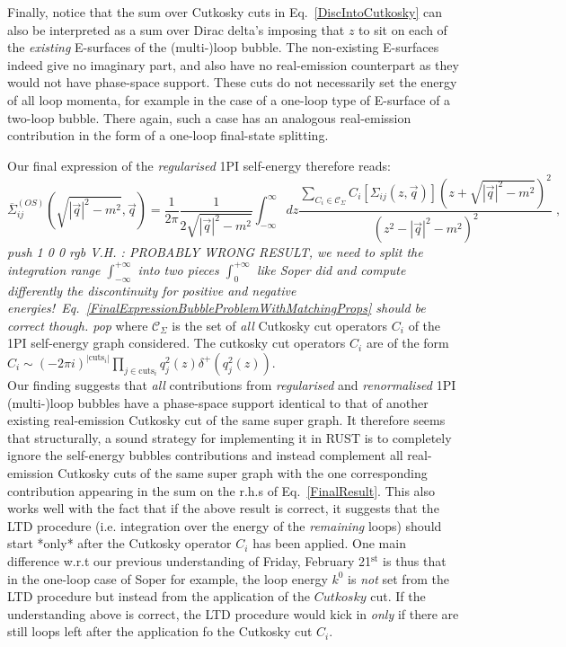 \documentclass[11pt]{article}
\def\cmtVH#1{\emph{\pdfcolorstack\MyArticleWithColor push {1 0 0 rgb} V.H. : #1 \pdfcolorstack\MyArticleWithColor pop}}
\begin{document}
Finally, notice that the sum over Cutkosky cuts in Eq.~\ref{DiscIntoCutkosky} can also be interpreted as a sum over Dirac delta's imposing that $z$ to sit on each of the \emph{existing} E-surfaces of the (multi-)loop bubble.
The non-existing E-surfaces indeed give no imaginary part, and also have no real-emission counterpart as they would not have phase-space support.
These cuts do not necessarily set the energy of all loop momenta, for example in the case of a one-loop type of E-surface of a two-loop bubble. There again, such a case has an analogous real-emission contribution in the form of a one-loop final-state splitting.

Our final expression of the \emph{regularised} 1PI self-energy therefore reads:
\begin{equation}
\overline{\Sigma}_{ij}^{(OS)}(\sqrt{|\vec{q}|^2-m^2 }, \vec{q}) = \frac{ 1 }{2\pi} \frac{1}{2\sqrt{|\vec{q}|^2-m^2 }} 
\int_{-\infty}^\infty dz \frac{ 
\sum_{C_i \in \mathcal{C}_\Sigma} C_i\left[ \Sigma_{ij}(z, \vec{q})\right] \left( z + \sqrt{|\vec{q}|^2-m^2 }\right)^2
}{( z^2 - |\vec{q}|^2-m^2)^2 } \;
\label{FinalResult},
\end{equation}
\cmtVH{PROBABLY WRONG RESULT, we need to split the integration range $\int_{-\infty}^{+\infty}$ into two pieces $\int_{0}^{+\infty}$ like Soper did and compute differently the discontinuity for positive and negative energies!\ Eq.~\ref{FinalExpressionBubbleProblemWithMatchingProps} should be correct though.}
where $\mathcal{C}_\Sigma$ is the set of \emph{all} Cutkosky cut operators $C_i$ of the 1PI self-energy graph considered.
The cutkosky cut operators $C_i$ are of the form $C_i \sim (-2\pi i)^{|\textrm{cuts}_i|} \prod_{j\in \textrm{cuts}_i} q_j^2(z) \delta^+\left(q_j^2(z)\right)$.\\
Our finding suggests that \emph{all} contributions from \emph{regularised} and \emph{renormalised} 1PI (multi-)loop bubbles have a phase-space support identical to that of another existing real-emission Cutkosky cut of the same super graph. It therefore seems that structurally, a sound strategy for implementing it in {\sc\small RUST} is to completely ignore the self-energy bubbles contributions and instead complement all real-emission Cutkosky cuts of the same super graph with the one corresponding contribution appearing in the sum on the r.h.s of Eq.~\ref{FinalResult}. This also works well with the fact that if the above result is correct, it suggests that the LTD procedure (i.e. integration over the energy of the \emph{remaining} loops) should start *only* after the Cutkosky operator $C_i$ has been applied.
One main difference w.r.t our previous understanding of Friday, February 21$^\textrm{st}$ is thus that in the one-loop case of Soper for example, the loop energy $k^0$ is \emph{not} set from the LTD procedure but instead from the application of the $Cutkosky$ cut.
If the understanding above is correct, the LTD procedure would kick in \emph{only} if there are still loops left after the application fo the Cutkosky cut $C_i$.
\end{document}
